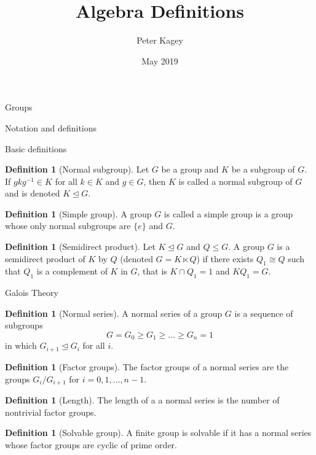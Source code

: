 \documentclass{article}
\title{Algebra Definitions}
\author{Peter Kagey}
\date{May 2019}
\theoremstyle{definition}
\numberwithin{theorem}{subsection} %
\theoremstyle{remark}
\theoremstyle{definition}
\newtheorem{definition}[paragraph]{Definition}
\newcommand{\set}[1]{\{#1\}}
\begin{document}
\maketitle

\begin{section}{Groups}
  \begin{subsection}{Notation and definitions}
    \begin{subsubsection}{Basic definitions}
      \begin{definition}[Normal subgroup]
        Let $G$ be a group and $K$ be a subgroup of $G$. If $gkg^{-1} \in K$
        for all $k \in K$ and $g \in G$, then $K$ is called a normal subgroup of
        $G$ and is denoted $K \trianglelefteq G$.
      \end{definition}
      \begin{definition}[Simple group]
        A group $G$ is called a simple group is a group whose only normal
        subgroups are $\set e$ and $G$.
      \end{definition}
      \begin{definition}[Semidirect product]
        Let $K \trianglelefteq G$ and $Q \leq G$. A group $G$ is a semidirect
        product of $K$ by $Q$ (denoted $G = K \ltimes Q$) if there exists
        $Q_1 \cong Q$ such that $Q_1$ is a
        complement of $K$ in $G$, that is $K \cap Q_1 = 1$ and $KQ_1 = G$.
      \end{definition}
    \end{subsubsection}
    \begin{subsubsection}{Galois Theory}
      \begin{definition}[Normal series]
        A normal series of a group $G$ is a sequence of subgroups \[
          G = G_0 \geq G_1 \geq \hdots \geq G_n = 1
        \] in which $G_{i+1} \trianglelefteq G_i$ for all $i$.
      \end{definition}
      \begin{definition}[Factor groups]
        The factor groups of a normal series are the groups $G_i/G_{i+1}$ for
        $i = 0, 1, \hdots, n-1$.
      \end{definition}
      \begin{definition}[Length]
        The length of a a normal series is the number of nontrivial factor
        groups.
      \end{definition}
      \begin{definition}[Solvable group]
        A finite group is solvable if it has a normal series whose factor groups
        are cyclic of prime order.

\end{definition}
\end{subsubsection}
\end{subsection}
\end{section}
\end{document}
